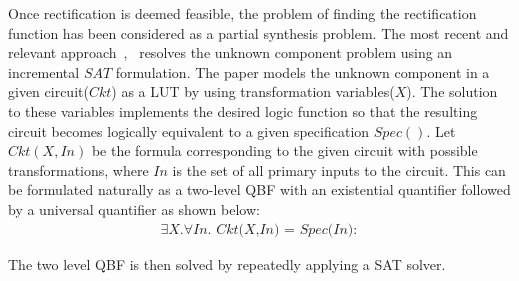 
Once rectification is deemed feasible, the problem of finding the
rectification function has been considered as a partial synthesis
problem. The most recent and relevant
approach~\cite{fujita:2015},~\cite{fujita:2012} resolves the unknown
component problem using an incremental $SAT$ formulation. The paper
models the unknown component in a given circuit($Ckt$) as a LUT by
using transformation variables($X$). The solution to these variables
implements the desired logic function so that the resulting circuit
becomes logically equivalent to a given specification $Spec()$. Let
$Ckt(X,In)$ be the formula corresponding to the given circuit with
possible transformations, where $In$ is the set of all primary inputs
to the circuit. This can be formulated naturally as a two-level QBF
with an existential quantifier followed by a universal quantifier as
shown below: 
\vspace{0.1in}
\begin{align}
\exists \textit{X}.\forall \textit{In. Ckt(X,In) = Spec(In)}:    
\end{align}

The two level QBF is then solved by repeatedly applying a SAT solver. 
  

